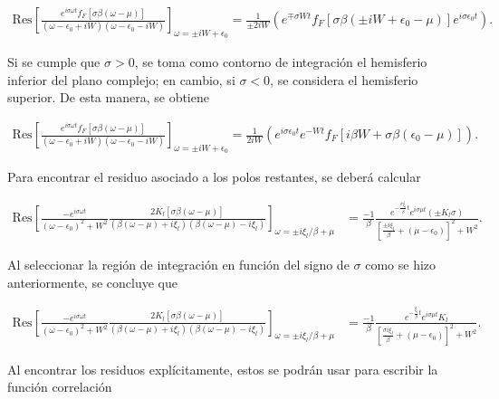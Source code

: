 \begin{appendixs}
\begin{align*}
   \text{Res} \left[ \frac{e^{ i\sigma \omega t} f_{F}[\sigma \beta (\omega-\mu)] }{ (\omega-\epsilon_{0} + iW)(\omega -\epsilon_{0} -iW)}\right]_{\omega = \pm i W + \epsilon_{0}} = \frac{1}{\pm 2iW} ( e^{\mp \sigma Wt} f_{F}[\sigma \beta(\pm iW +\epsilon_{0}-\mu)]e^{i\sigma \epsilon_{0}t}). 
\end{align*}

Si se cumple que $\sigma > 0$, se toma como contorno de integración el hemisferio inferior del plano complejo; en cambio, si $\sigma < 0$, se considera el hemisferio superior. De esta manera, se obtiene

\begin{align*}
    \text{Res} \left[ \frac{e^{ i\sigma \omega t} f_{F}[\sigma \beta (\omega-\mu)] }{ (\omega-\epsilon_{0} + iW)(\omega -\epsilon_{0} -iW)}\right]_{\omega = \pm i W + \epsilon_{0}} = \frac{1}{ 2iW} ( e^{i\sigma \epsilon_{0}t}e^{- Wt} f_{F}[i\beta W + \sigma \beta(\epsilon_{0}-\mu)]). 
 \end{align*}

Para encontrar el residuo asociado a los polos restantes, se deberá calcular

\begin{align*}
    \text{Res} \left[ \frac{-e^{i\sigma \omega t}}{(\omega - \epsilon_{0})^{2} + W^{2} } \frac{ 2K_{l}[\sigma \beta (\omega-\mu)] }{ (\beta(\omega-\mu) + i \xi_{l} )(\beta(\omega-\mu) - i \xi_{l})} \right]_{\omega = \pm i \xi_{l}/\beta + \mu} & = \frac{-1}{\beta} \frac{e^{- \frac{\sigma \xi_{l}}{\beta}t} e^{i\sigma \mu t}(\pm K_{l}\sigma )}{ [ \frac{ \pm i\xi_{l}}{\beta} + (\mu - \epsilon_{0}) ]^{2} + W^{2} }.
\end{align*}

Al seleccionar la región de integración en función del signo de $\sigma$ como se hizo anteriormente, se concluye que

\begin{align*}
    \text{Res} \left[ \frac{-e^{i\sigma \omega t}}{(\omega - \epsilon_{0})^{2} + W^{2} } \frac{ 2K_{l}[\sigma \beta (\omega-\mu)] }{ (\beta(\omega-\mu) + i \xi_{l} )(\beta(\omega-\mu) - i \xi_{l})} \right]_{\omega = \pm i \xi_{l}/\beta + \mu} & = \frac{-1}{\beta} \frac{e^{- \frac{ \xi_{l}}{\beta}t} e^{i\sigma \mu t} K_{l} }{ [ \frac{ \sigma i\xi_{l}}{\beta} + (\mu - \epsilon_{0}) ]^{2} + W^{2} }. 
\end{align*}

Al encontrar los residuos explícitamente, estos se podrán usar para escribir la función correlación 


\end{appendixs}
